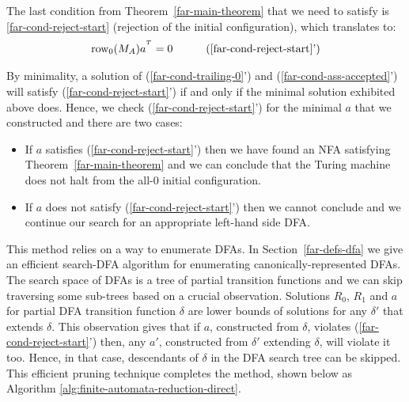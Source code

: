 The last condition from Theorem~\ref{far-main-theorem} that we need to satisfy is \eqref{far-cond-reject-start} (rejection of the initial configuration), which translates to:
\begin{align}
  \row_0 (M_A) a^{\T} & =0
                      & \tag{\ref{far-cond-reject-start}'}
\end{align}

By minimality, a solution of (\ref{far-cond-trailing-0}') and (\ref{far-cond-ass-accepted}') will satisfy (\ref{far-cond-reject-start}') if and only if the minimal solution exhibited above does. Hence, we check (\ref{far-cond-reject-start}') for the minimal $a$ that we constructed and there are two cases:

\begin{itemize}
  \item If $a$ satisfies (\ref{far-cond-reject-start}') then we have found an NFA satisfying Theorem~\ref{far-main-theorem} and we can conclude that the Turing machine does not halt from the all-0 initial configuration.
  \item If $a$ does not satisfy (\ref{far-cond-reject-start}') then we cannot conclude and we continue our search for an appropriate left-hand side DFA.
\end{itemize}

This method relies on a way to enumerate DFAs. In Section~\ref{far-defs-dfa} we give an efficient {\sc search-DFA} algorithm for enumerating canonically-represented DFAs. The search space of DFAs is a tree of partial transition functions and we can skip traversing some sub-trees based on a crucial observation. Solutions $R_0$, $R_1$ and $a$ for partial DFA transition function $\delta$ are lower bounds of solutions for any $\delta'$ that extends $\delta$. This observation gives that if $a$, constructed from $\delta$, violates (\ref{far-cond-reject-start}') then, any $a'$, constructed from $\delta'$ extending $\delta$, will violate it too. Hence, in that case, descendants of $\delta$ in the DFA search tree can be skipped.
This efficient pruning technique completes the method, shown below as Algorithm \ref{alg:finite-automata-reduction-direct}.

